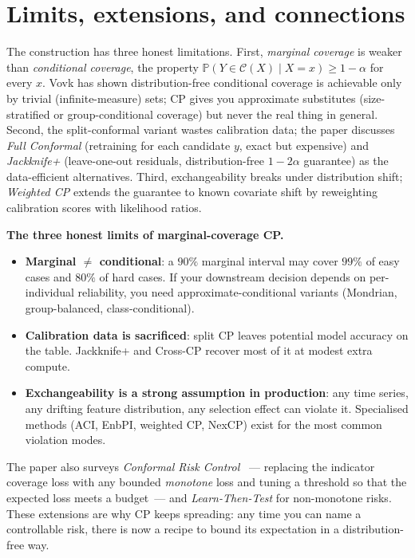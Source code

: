 \documentclass[letterpaper,11pt,leqno]{article}
\begin{document}
\section{Limits, extensions, and connections}\label{s:discussion}

The construction has three honest limitations. First, \emph{marginal coverage} is weaker than \emph{conditional coverage}, the property $\mathbb{P}(Y \in \mathcal{C}(X) \mid X = x) \geq 1 - \alpha$ for every $x$. Vovk has shown distribution-free conditional coverage is achievable only by trivial (infinite-measure) sets; CP gives you approximate substitutes (size-stratified or group-conditional coverage) but never the real thing in general. Second, the split-conformal variant wastes calibration data; the paper discusses \emph{Full Conformal} (retraining for each candidate $y$, exact but expensive) and \emph{Jackknife+} \cite{barber2021jackknifeplus} (leave-one-out residuals, distribution-free $1 - 2\alpha$ guarantee) as the data-efficient alternatives. Third, exchangeability breaks under distribution shift; \emph{Weighted CP} \cite{tibshirani2019weighted} extends the guarantee to known covariate shift by reweighting calibration scores with likelihood ratios.

\begin{whymatters}
\textbf{The three honest limits of marginal-coverage CP.}
\begin{itemize}
\item \textbf{Marginal $\neq$ conditional}: a $90\%$ marginal interval may cover $99\%$ of easy cases and $80\%$ of hard cases. If your downstream decision depends on per-individual reliability, you need approximate-conditional variants (Mondrian, group-balanced, class-conditional).
\item \textbf{Calibration data is sacrificed}: split CP leaves potential model accuracy on the table. Jackknife+ and Cross-CP recover most of it at modest extra compute.
\item \textbf{Exchangeability is a strong assumption in production}: any time series, any drifting feature distribution, any selection effect can violate it. Specialised methods (ACI, EnbPI, weighted CP, NexCP) exist for the most common violation modes.
\end{itemize}
\end{whymatters}

The paper also surveys \emph{Conformal Risk Control} \cite{angelopoulos2024conformal}~--- replacing the indicator coverage loss with any bounded \emph{monotone} loss and tuning a threshold so that the expected loss meets a budget~--- and \emph{Learn-Then-Test} for non-monotone risks. These extensions are why CP keeps spreading: any time you can name a controllable risk, there is now a recipe to bound its expectation in a distribution-free way.
\end{document}
